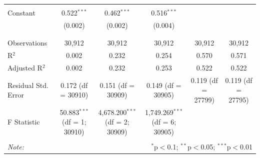 \begin{table}[!htbp]
\begin{tabular}{@{\extracolsep{5pt}}lccccc}
  & & & & & \\ 
 Constant & 0.522$^{***}$ & 0.462$^{***}$ & 0.516$^{***}$ &  &  \\ 
  & (0.002) & (0.002) & (0.004) &  &  \\ 
  & & & & & \\ 
\hline \\[-1.8ex] 
Observations & 30,912 & 30,912 & 30,912 & 30,912 & 30,912 \\ 
R$^{2}$ & 0.002 & 0.232 & 0.254 & 0.570 & 0.571 \\ 
Adjusted R$^{2}$ & 0.002 & 0.232 & 0.253 & 0.522 & 0.522 \\ 
Residual Std. Error & 0.172 (df = 30910) & 0.151 (df = 30909) & 0.149 (df = 30905) & 0.119 (df = 27799) & 0.119 (df = 27795) \\ 
F Statistic & 50.883$^{***}$ (df = 1; 30910) & 4,678.200$^{***}$ (df = 2; 30909) & 1,749.269$^{***}$ (df = 6; 30905) &  &  \\ 
\hline 
\hline \\[-1.8ex] 
\textit{Note:}  & \multicolumn{5}{r}{$^{*}$p$<$0.1; $^{**}$p$<$0.05; $^{***}$p$<$0.01} \\ 
\end{tabular} 
\end{table} 
